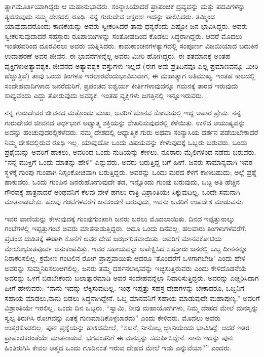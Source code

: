 ತ್ಯಾಗಮೂರ್ತಿಯಾಗಿದ್ದರು ಆ ಮಹಾನುಭಾವರು. ಸಂನ್ಯಾಸಿಯಾದರೆ ಪ್ರಾಪಂಚಿಕ ದ್ರವ್ಯವನ್ನು ಮತ್ತು ಪದವಿಗಳನ್ನು ತ್ಯಜಿಸುವುದು ನಮ್ಮ ದೇಶದಲ್ಲಿ ರೂಢಿ. ನನ್ನ ಗುರುದೇವ ಅಕ್ಷರಶಃ ಇದನ್ನು ಪಾಲಿಸಿದರು. ತಮ್ಮಿಂದ ಯಾವುದಾದರೊಂದು ಕಾಣಿಕೆಯನ್ನು ಅವರು ಸ್ವೀಕರಿಸಿದರೆ ತಾವು ಧನ್ಯರೆಂದು ಎಷ್ಟೋ ಜನ ಭಾವಿಸಿದ್ದರು. ಅವರು ಸ್ವೀಕರಿಸುವುದಾದರೆ ಸಹಸ್ರಾರು ರೂಪಾಯಿಗಳನ್ನು ಸಂತೋಷದಿಂದ ಕೊಡಲು ಸಿದ್ಧರಾಗಿದ್ದರು. ಆದರೆ ಮೊದಲು ಇಂತಹವರಿಂದ ದೂರವಿರಲು ಅವರು ಯತ್ನಿಸಿದರು. ಕಾಮಕಾಂಚನಗಳ\break ತ್ಯಾಗದಲ್ಲಿ ಸಂಪೂರ್ಣ ವಿಜಯಿಯಾದ ಬದುಕಿನ ಉದಾಹರಣೆ ಅವರ ಜೀವನ. ಈ ಭಾವನೆಗಳನ್ನೆಲ್ಲ ಅವರು ಮೀರಿ ಹೋಗಿದ್ದರು. ಈ ಶತಮಾನಕ್ಕೆ ಅಂತಹ ವ್ಯಕ್ತಿಗಳು\break ಅತ್ಯಾವಶ್ಯಕ. ಜೀವನದ ಅತ್ಯಾವಶ್ಯಕ ವಸ್ತುಗಳು ಇಲ್ಲದೆ (ಈಗ ಅವು ಪ್ರತಿದಿನವೂ ಎಲ್ಲ ಪ್ರಮಾಣವನ್ನೂ ಮೀರಿ ಹೆಚ್ಚುತ್ತಿವೆ) ತಾವು ಒಂದು ತಿಂಗಳೂ ಇರಲಾರವೆಂದು\break ಭಾವಿಸುವಾಗ, ಈ ಮಹಾತ್ಯಾಗ ಅತಿಮುಖ್ಯ. ಇಂತಹ ಕಾಲದಲ್ಲಿ ಸಂದೇಹವಾದಿಗಳಾದ ಜನರೆದುರಿಗೆ, ಪ್ರಪಂಚದ ಐಶ್ವರ್ಯ ಕೀರ್ತಿಗಳಾವುದನ್ನೂ ಗಮನಕ್ಕೆ ತಾರದೆ ಇರುವುದು ಸಾಧ್ಯವೆಂದು ಎದ್ದು ತೋರುವುದು ಅವಶ್ಯಕ. ಇಂತಹ ವ್ಯಕ್ತಿಗಳು ಜಗತ್ತಿನಲ್ಲಿ ಇನ್ನೂ\break ಇರುವರು.

ನನ್ನ ಗುರುದೇವರ ಜೀವನದ ಮತ್ತೊಂದು ಮುಖ, ಅವರಿಗೆ ಮಾನವ ಕೋಟಿಯಲ್ಲಿ ಇದ್ದ ಅಪಾರ ಪ್ರೇಮ. ನನ್ನ ಗುರುದೇವರ ಜೀವನದ ಅರ್ಧಭಾಗ ಅಧ್ಯಾತ್ಮ ಶಕ್ತಿಯನ್ನು ಶೇಖರಿಸುವುದರಲ್ಲಿ ಕಳೆಯಿತು. ಉಳಿದ ಆಯುಷ್ಯವನ್ನು ಅದನ್ನು ಹಂಚುವುದರಲ್ಲಿ\break ಕಳೆದರು. ನಮ್ಮ ದೇಶದಲ್ಲಿ ಆಧ್ಯಾತ್ಮಿಕ ಗುರು ಅಥವಾ ಸಂನ್ಯಾಸಿಯ ದರ್ಶನ ಪಡೆಯಬೇಕಾದರೆ ನಿಮ್ಮ ದೇಶದಲ್ಲಿರುವ ರೂಢಿ ಇಲ್ಲ. ಯಾವುದೋ ಒಂದು ವಿಷಯವನ್ನು ಕೇಳುವುದಕ್ಕೆ ಒಬ್ಬರು ಬರುವರು. ಒಂದು ಪ್ರಶ್ನೆಯನ್ನು ಅವರಿಗೆ ಹಾಕಲು, ಅವರಿಂದ ಒಂದು ನುಡಿಯನ್ನು ಕೇಳಲು, ನೂರಾರು ಮೈಲಿಗಳಿಂದ ನಡೆದು ಬರುವರು. “ನನ್ನ ಮುಕ್ತಿಗೆ ಒಂದು ಮಾತನ್ನು ಹೇಳಿ” ಎನ್ನುವರು. ಅವರು ಬರುತ್ತಿದ್ದ ಬಗೆ ಹೀಗೆ. ಜನರು ಸಾಮಾನ್ಯವಾಗಿ ಇವರ ಸ್ಥಳಕ್ಕೆ ಗುಂಪು ಗುಂಪಾಗಿ ನಿಸ್ಸಂಕೋಚವಾಗಿ ಬರುತ್ತಿದ್ದರು. ಅವರನ್ನು ಒಂದು ಮರದ ಕೆಳಗೆ ಕಾಣಬಹುದು; ಅಲ್ಲೆ ಪ್ರಶ್ನೆ ಹಾಕುವರು. ಒಂದು ಗುಂಪಿನ ಜನರು\break ಹೋಗುವುದೇ ತಡ, ಇನ್ನೊಂದು ಗುಂಪು ಬರುವುದು, ಒಬ್ಬ ಅತಿ ಹೆಚ್ಚಿನ ಗೌರವಕ್ಕೆ ಪಾತ್ರನಾದರೆ ಅಂಥವನಿಗೆ ಕೆಲವು ವೇಳೆ ಹಗಲು ರಾತ್ರಿ ವಿಶ್ರಾಂತಿಯೇ ಸಿಕ್ಕುವುದಿಲ್ಲ. ಒಂದೇ ಸಮನಾಗಿ ಮಾತನಾಡಬೇಕು. ಹಲವು ಗಂಟೆಗಳವರೆಗೆ ಜನಸಂದಣಿ ಬರುವುದು, ಇವನು ಅವರಿಗೆ ಉಪದೇಶ ಮಾಡುವನು.

ಇವರ ವಾಣಿಯನ್ನು ಕೇಳುವುದಕ್ಕೆ ಗುಂಪುಗುಂಪಾಗಿ ಜನರು ಬರಲು ಮೊದಲಾಯಿತು. ದಿನದ ಇಪ್ಪತ್ತುನಾಲ್ಕು ಗಂಟೆಗಳಲ್ಲಿ ಇಪ್ಪತ್ತುಗಂಟೆ ಅವರು ಮಾತನಾಡುತ್ತಿದ್ದರು. ಅದೂ ಒಂದು ದಿನವಲ್ಲ, ಹಲವಾರು ತಿಂಗಳುಗಳವರೆಗೆ. ಪ್ರಚಂಡ ದುಡಿತಕ್ಕೆ ಈಡಾಗಿ ಕೊನೆಗೆ ಅವರ ದೇಹ ಜರ್ಝರಿತವಾಯಿತು. ಅವರಿಗೆ ಮಾನವಕೋಟಿಯ ಮೇಲೆ\break ಅಭೂತಪೂರ್ವ ಅನುಕಂಪವಿತ್ತು. ಇವರ ಸಹಾಯವನ್ನು ಅಪೇಕ್ಷಿಸಿದ ಸಹಸ್ರಾರು ಜನರಲ್ಲಿ ಒಬ್ಬ ದೀನನನ್ನೂ ನಿರಾಕರಿಸಲಿಲ್ಲ. ಕ್ರಮೇಣ ಗಂಟಲಿನ ರೋಗ ಪ್ರಾಪ್ತವಾಯಿತು.\break ಆದರೂ ‘ತೊಂದರೆಗೆ ಒಳಗಾಗಬೇಡಿ’ ಎಂದು ಹೇಳಿ ಅವರನ್ನು ಸುಮ್ಮನಿರಿಸಲು\break ಆಗಲಿಲ್ಲ. ಜನರು ತಮ್ಮ ದರ್ಶನಲಾಭವನ್ನು ಇಚ್ಛಿಸುತ್ತಿರುವರು ಎಂದು ಕೇಳಿದೊಡನೆಯೆ ಅವರನ್ನು ಒಳಗೆ ಬಿಡಬೇಕೆಂದು ಬಲಾತ್ಕಾರಮಾಡಿ ಅವರ ಸಂದೇಹವನ್ನೆಲ್ಲಾ ನಿವಾರಿಸುತ್ತಿದ್ದರು. ಅವರನ್ನು ಎಚ್ಚರಿಸಿದಾಗ ಹೀಗೆ ಹೇಳುವರು: “ನಾನು ಇದನ್ನು ಲೆಕ್ಕಿಸುವುದಿಲ್ಲ. ಇಂಥ ಇಪ್ಪತ್ತು ಸಹಸ್ರ ದೇಹಗಳನ್ನು ಬೇಕಾದರೂ, ಒಬ್ಬನಿಗೆ ಸಹಾಯ ಮಾಡಲು,\break ನಾನು ಬಿಡಲು ಸಿದ್ಧನಾಗಿದ್ದೇನೆ. ಒಬ್ಬ ಮಾನವನಿಗೆ ಸಹಾಯ ಮಾಡುವುದೇ ಮಹಾಪುಣ್ಯ.” ಅವರಿಗೆ ವಿಶ್ರಾಂತಿಯೇ ಇರಲಿಲ್ಲ. ಒಂದು ದಿನ ಒಬ್ಬರು, “ಸ್ವಾಮಿ, ನೀವು ಮಹಾಯೋಗಿಗಳು, ನಿಮ್ಮ ದೇಹದ ಮೇಲೆ ಮನಸ್ಸನ್ನು ಸ್ವಲ್ಪ ತಿರುಗಿಸಿ ರೋಗವನ್ನು ಏತಕ್ಕೆ ಗುಣಮಾಡಿಕೊಳ್ಳಬಾರದು” ಎಂದು ಕೇಳಿದರು. ಮೊದಲು ಅವರು ಉತ್ತರಕೊಡಲಿಲ್ಲ. ಪುನಃ ಪ್ರಶ್ನೆಯನ್ನು ಹಾಕಿದಮೇಲೆ, “ಸಖನೆ, ನೀನೊಬ್ಬ ಜ್ಞಾನಿಯೆಂದು ಭಾವಿಸಿದ್ದೆ. ಆದರೆ ಇತರ ಪ್ರಾಪಂಚಿಕರಂತೆಯೇ ಮಾತನಾಡುವೆ. ಭಗವಂತನಿಗೆ ಈ ಮನಸ್ಸನ್ನು ಸಮರ್ಪಿಸಿದ್ದೇನೆ. ನಾನು ಇದನ್ನು ಪುನಃ ಹಿಂತಿರುಗಿಸಿ ಕೇವಲ ಆತ್ಮದ ಒಂದು ಗೂಡಿನಂತೆ ಇರುವ ದೇಹದ ಮೇಲೆ ಇಡು ಎನ್ನುವೆಯಾ?” ಎಂದರು.

